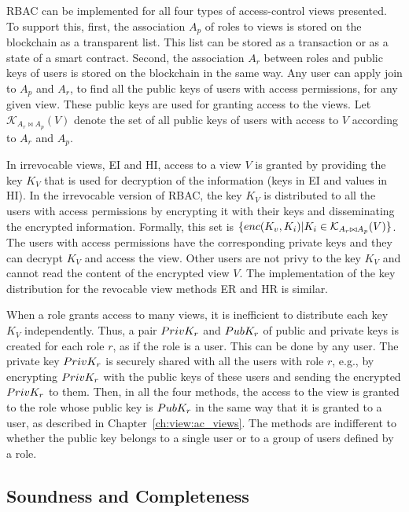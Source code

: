 RBAC can be implemented for all four types of access-control views presented.
To support this, first, the association $A_p$ of roles to views is stored on the blockchain as a transparent list. This list can be stored as a transaction or as a state of a smart contract. Second, the association $A_r$ between roles and public keys of users is stored on the blockchain in the same way. Any user can apply join to $A_p$ and $A_r$, to find all the public keys of users with access permissions, for any given view. These public keys are used for granting access to the views. 
Let $\mathcal{K}_{A_r\bowtie A_p}(V)$ denote the set of all public keys of users with access to $V$ according to $A_r$ and $A_p$. 

In irrevocable views, EI and HI, access to a view $V$ is granted by providing the key $K_V$ that is used for decryption of the information (keys in EI and values in HI). In the irrevocable version of RBAC, the key $K_V$ is distributed to all the users with access permissions by encrypting it with their keys and disseminating the encrypted information. Formally, this set is $\{enc\/(K_v, K_i) | K_i\in \mathcal{K}_{A_r\bowtie A_p}(V)\}$. The users with access permissions have the corresponding private keys and they can decrypt $K_V$ and access the view. Other users are not privy to the key $K_V$ and cannot read the content of the encrypted view $V$.   The implementation of the key distribution for the revocable view methods ER and HR is similar. 

When a role grants access to many views, it is inefficient to distribute each key $K_V$ independently. 
Thus, a pair  $PrivK_{r}$ and $PubK_{r}$ of public and private keys is created for each role $r$, as if the role is a user. This can be done by any user. %
The private key $PrivK_{r}$ is securely shared with all the users with role $r$, e.g., by encrypting $PrivK_{r}$ with the public keys of these users and sending the encrypted $PrivK_{r}$ to them. Then, in all the four methods, the access to the view is granted to the role whose public key is $PubK_{r}$ in the same way that it is granted to a user, as described in Chapter~\ref{ch:view:ac_views}. The methods are indifferent to whether the public key belongs to a single user or to a group of users defined by a role. 

\subsection{Soundness and Completeness}
\label{ch:view:ac_views:security_model}

